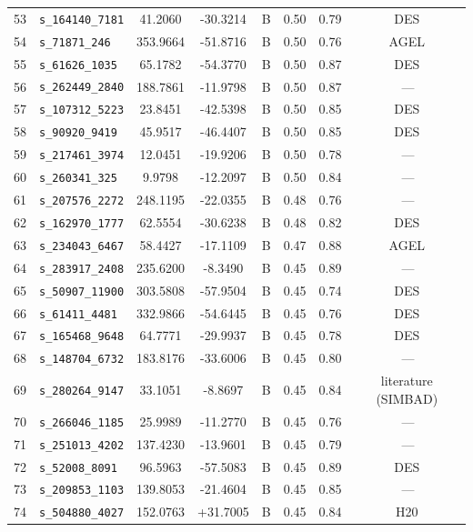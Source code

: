 \begin{longtable}{rlcccccc}
53 & \texttt{s\_164140\_7181} & 41.2060 & -30.3214 & B & 0.50 & 0.79 & DES \\
54 & \texttt{s\_71871\_246} & 353.9664 & -51.8716 & B & 0.50 & 0.76 & AGEL \\
55 & \texttt{s\_61626\_1035} & 65.1782 & -54.3770 & B & 0.50 & 0.87 & DES \\
56 & \texttt{s\_262449\_2840} & 188.7861 & -11.9798 & B & 0.50 & 0.87 & \,--- \\
57 & \texttt{s\_107312\_5223} & 23.8451 & -42.5398 & B & 0.50 & 0.85 & DES \\
58 & \texttt{s\_90920\_9419} & 45.9517 & -46.4407 & B & 0.50 & 0.85 & DES \\
59 & \texttt{s\_217461\_3974} & 12.0451 & -19.9206 & B & 0.50 & 0.78 & \,--- \\
60 & \texttt{s\_260341\_325} & 9.9798 & -12.2097 & B & 0.50 & 0.84 & \,--- \\
61 & \texttt{s\_207576\_2272} & 248.1195 & -22.0355 & B & 0.48 & 0.76 & \,--- \\
62 & \texttt{s\_162970\_1777} & 62.5554 & -30.6238 & B & 0.48 & 0.82 & DES \\
63 & \texttt{s\_234043\_6467} & 58.4427 & -17.1109 & B & 0.47 & 0.88 & AGEL \\
64 & \texttt{s\_283917\_2408} & 235.6200 & -8.3490 & B & 0.45 & 0.89 & \,--- \\
65 & \texttt{s\_50907\_11900} & 303.5808 & -57.9504 & B & 0.45 & 0.74 & DES \\
66 & \texttt{s\_61411\_4481} & 332.9866 & -54.6445 & B & 0.45 & 0.76 & DES \\
67 & \texttt{s\_165468\_9648} & 64.7771 & -29.9937 & B & 0.45 & 0.78 & DES \\
68 & \texttt{s\_148704\_6732} & 183.8176 & -33.6006 & B & 0.45 & 0.80 & \,--- \\
69 & \texttt{s\_280264\_9147} & 33.1051 & -8.8697 & B & 0.45 & 0.84 & literature (SIMBAD) \\
70 & \texttt{s\_266046\_1185} & 25.9989 & -11.2770 & B & 0.45 & 0.76 & \,--- \\
71 & \texttt{s\_251013\_4202} & 137.4230 & -13.9601 & B & 0.45 & 0.79 & \,--- \\
72 & \texttt{s\_52008\_8091} & 96.5963 & -57.5083 & B & 0.45 & 0.89 & DES \\
73 & \texttt{s\_209853\_1103} & 139.8053 & -21.4604 & B & 0.45 & 0.85 & \,--- \\
74 & \texttt{s\_504880\_4027} & 152.0763 & +31.7005 & B & 0.45 & 0.84 & H20 \\

\end{longtable}

